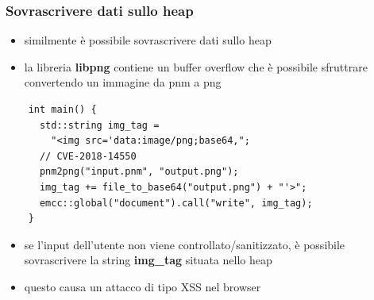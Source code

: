 \documentclass{beamer}
\begin{document}
\begin{frame}[fragile]
  \frametitle{Sovrascrivere dati sullo heap}
  \begin{itemize}
    \item similmente è possibile sovrascrivere dati sullo heap
    \item la libreria \textbf{libpng} contiene un buffer overflow che
      è possibile sfruttrare convertendo un immagine da pnm a png 
  \end{itemize}
  \begin{verbatim}
    int main() {
      std::string img_tag = 
        "<img src='data:image/png;base64,";
      // CVE-2018-14550
      pnm2png("input.pnm", "output.png");        
      img_tag += file_to_base64("output.png") + "'>";
      emcc::global("document").call("write", img_tag);
    }
  \end{verbatim}
  \begin{itemize}
    \item se l'input dell'utente non viene controllato/sanitizzato, è possibile
      sovrascrivere la string \textbf{img\_tag} situata nello heap 
    \item questo causa un attacco di tipo XSS nel browser
  \end{itemize}
\end{frame}
\end{document}
